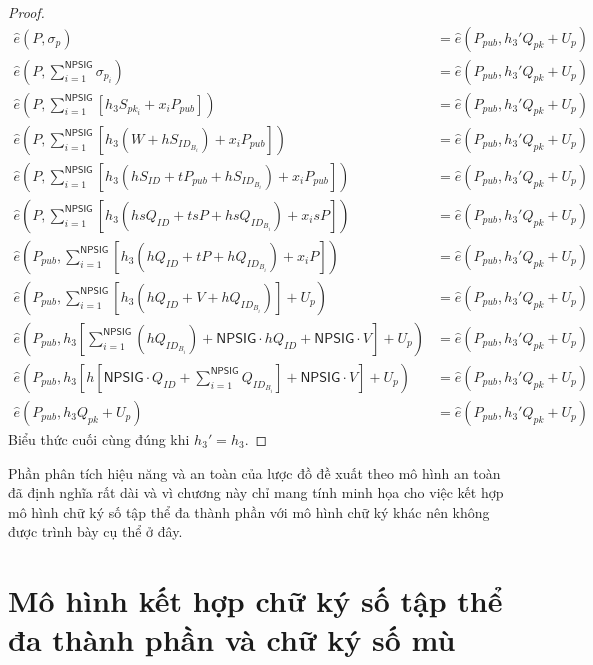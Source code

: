\begin{proof}
	\begin{align*}
	\hat{e}(P,\sigma_p)  &= \hat{e}(P_{pub},h_3'Q_{pk} + U_p) \\
	\hat{e}(P,\sum_{i=1}^{\mathsf{NPSIG}}\sigma_{p_i}) &= \hat{e}(P_{pub},h_3'Q_{pk} + U_p) \\
	\hat{e}(P,\sum_{i=1}^{\mathsf{NPSIG}} \left[ h_3S_{pk_i} + x_iP_{pub} \right] ) &= \hat{e}(P_{pub},h_3'Q_{pk} + U_p) \\
	\hat{e}(P,\sum_{i=1}^{\mathsf{NPSIG}}\left[ h_3\left(W + hS_{ID_{B_i}} \right)  + x_iP_{pub} \right]) &= \hat{e}(P_{pub},h_3'Q_{pk} + U_p) \\
	\hat{e}(P,\sum_{i=1}^{\mathsf{NPSIG}}\left[ h_3\left(hS_{ID} + tP_{pub} + hS_{ID_{B_i}} \right)  + x_iP_{pub} \right]) &= \hat{e}(P_{pub},h_3'Q_{pk} + U_p) \\
	\hat{e}(P,\sum_{i=1}^{\mathsf{NPSIG}}\left[ h_3\left(hsQ_{ID} + tsP + hsQ_{ID_{B_i}} \right)  + x_isP \right]) &= \hat{e}(P_{pub},h_3'Q_{pk} + U_p) \\
	\hat{e}(P_{pub},\sum_{i=1}^{\mathsf{NPSIG}}\left[ h_3\left(hQ_{ID} + tP + hQ_{ID_{B_i}} \right)  + x_iP \right]) &= \hat{e}(P_{pub},h_3'Q_{pk} + U_p) \\
	\hat{e}(P_{pub},\sum_{i=1}^{\mathsf{NPSIG}}\left[ h_3\left(hQ_{ID} + V + hQ_{ID_{B_i}} \right) \right]+ U_p) &= \hat{e}(P_{pub},h_3'Q_{pk} + U_p) \\
	\hat{e}(P_{pub},h_3\left[\sum_{i=1}^{\mathsf{NPSIG}} \left(hQ_{ID_{B_i}} \right) + \mathsf{NPSIG}\cdot hQ_{ID} + \mathsf{NPSIG}\cdot V \right] + U_p) &= \hat{e}(P_{pub},h_3'Q_{pk} + U_p) \\
	\hat{e}(P_{pub},h_3\left[h\left[ \mathsf{NPSIG}\cdot Q_{ID} + \sum_{i=1}^{\mathsf{NPSIG}} Q_{ID_{B_i}}\right]  + \mathsf{NPSIG}\cdot V \right] + U_p) &= \hat{e}(P_{pub},h_3'Q_{pk} + U_p)\\
	\hat{e}(P_{pub},h_3Q_{pk} + U_p) &= \hat{e}(P_{pub},h_3'Q_{pk} + U_p)
	\end{align*}
	Biểu thức cuối cùng đúng khi $h_3' = h_3$.	
\end{proof}

Phần phân tích hiệu năng và an toàn của lược đồ đề xuất theo mô hình an toàn đã định nghĩa rất dài và vì chương này chỉ mang tính minh họa cho việc kết hợp mô hình chữ ký số tập thể đa thành phần với mô hình chữ ký khác nên không được trình bày cụ thể ở đây.

\section{\bf Mô hình kết hợp chữ ký số tập thể đa thành phần và chữ ký số mù}

